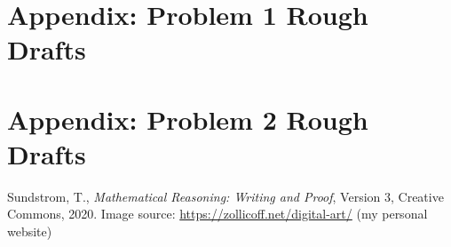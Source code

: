 \documentclass[12pt]{article}
\theoremstyle{definition}
\begin{document}

\appendix


\section{Appendix: Problem 1 Rough Drafts}




\section{Appendix: Problem 2 Rough Drafts}




\begin{thebibliography}{9}
  Sundstrom, T., \emph{Mathematical Reasoning: Writing and Proof}, Version 3,  Creative Commons, 2020.
  Image source: \url{https://zollicoff.net/digital-art/} (my personal website)
\end{thebibliography}
\end{document}
